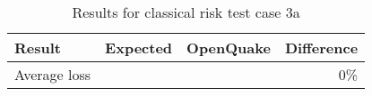 \begin{table}[htbp]

\centering
\begin{tabular}{ l r r r }

\hline
\rowcolor{anti-flashwhite}
\bf{Result} & \bf{Expected} & \bf{OpenQuake} & \bf{Difference}\\
\hline
Average loss &  &  & 0\% \\
\hline
\end{tabular}

\caption{Results for classical risk test case 3a}
\label{tab:result-classical-risk-3a}
\end{table}